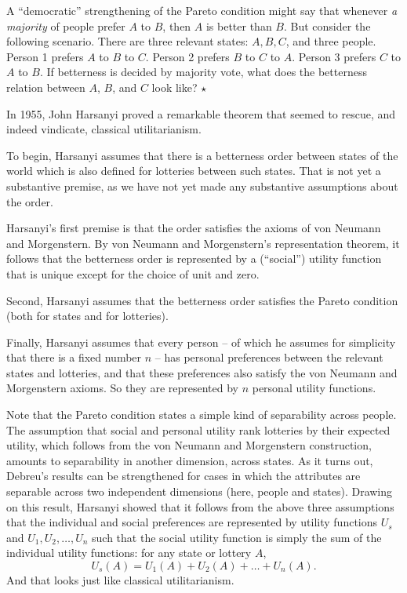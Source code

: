 \begin{exercise}
  A ``democratic'' strengthening of the Pareto condition might say
  that whenever \emph{a majority} of people prefer $A$ to $B$, then $A$
  is better than $B$. But consider the following scenario. There are
  three relevant states: $A,B,C$, and three people. Person 1 prefers
  $A$ to $B$ to $C$. Person 2 prefers $B$ to $C$ to $A$. Person 3
  prefers $C$ to $A$ to $B$. If betterness is decided by majority
  vote, what does the betterness relation between $A$, $B$, and $C$
  look like? $\star$
\end{exercise}

In 1955, John Harsanyi proved a remarkable theorem that seemed to
rescue, and indeed vindicate, classical utilitarianism. 

To begin, Harsanyi assumes that there is a betterness order
between states of the world which is also defined for lotteries between
such states. That is not yet a substantive premise, as we have not yet
made any substantive assumptions about the order. 

Harsanyi's first premise is that the order satisfies the axioms of von
Neumann and Morgenstern. By von Neumann and Morgenstern's
representation theorem, it follows that the betterness order is
represented by a (``social'') utility function that is unique except
for the choice of unit and zero.

Second, Harsanyi assumes that the betterness order satisfies the
Pareto condition (both for states and for lotteries).

Finally, Harsanyi assumes that every person -- of which he assumes for
simplicity that there is a fixed number $n$ -- has personal
preferences between the relevant states and lotteries, and that these
preferences also satisfy the von Neumann and Morgenstern axioms. So
they are represented by $n$ personal utility functions.

Note that the Pareto condition states a simple kind of separability
across people. The assumption that social and personal utility rank
lotteries by their expected utility, which follows from the von
Neumann and Morgenstern construction, amounts to separability in
another dimension, across states. As it turns out, Debreu's results
can be strengthened for cases in which the attributes are separable
across two independent dimensions (here, people and states). Drawing
on this result, Harsanyi showed that it follows from the above three
assumptions that the individual and social preferences are represented
by utility functions $U_s$ and $U_1,U_2,\ldots,U_n$ such that the
social utility function is simply the sum of the individual utility
functions: for any state or lottery $A$,
\[
  U_s(A) = U_1(A) + U_2(A) + \ldots + U_n(A).
\]
And that looks just like classical utilitarianism.

